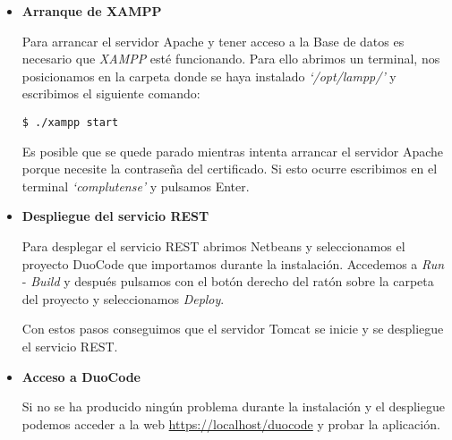 \begin{itemize}

\item \textbf{Arranque de XAMPP}

Para arrancar el servidor Apache y tener acceso a la Base de datos es necesario que \textit{XAMPP} esté funcionando. Para ello abrimos un terminal, nos posicionamos en la carpeta donde se haya instalado \textit{`/opt/lampp/'} y escribimos el siguiente comando:
{\codesize
\begin{verbatim}
$ ./xampp start
\end{verbatim}
}
Es posible que se quede parado mientras intenta arrancar el servidor Apache porque necesite la contraseña del certificado. Si esto ocurre escribimos en el terminal \textit{`complutense'} y pulsamos Enter.



\item \textbf{Despliegue del servicio REST}

Para desplegar el servicio REST abrimos Netbeans y seleccionamos el proyecto DuoCode que importamos durante la instalación. Accedemos a \textit{Run} - \textit{Build} y después pulsamos con el botón derecho del ratón sobre la carpeta del proyecto y seleccionamos \textit{Deploy}.

Con estos pasos conseguimos que el servidor Tomcat se inicie y se despliegue el servicio REST.

\item \textbf{Acceso a DuoCode}

Si no se ha producido ningún problema durante la instalación y el despliegue podemos acceder a la web \url{https://localhost/duocode} y probar la aplicación.

\end{itemize}